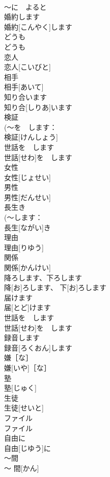 \documentclass[8pt]{extreport}
\begin{document}
\begin{CJK}{UTF8}{min}
\\	〜に　よると	
\\	婚約します	
\\	婚約[こんやく]します	
\\	どうも	
\\	どうも	
\\	恋人	
\\	恋人[こいびと]	
\\	相手	
\\	相手[あいて]	
\\	知り合います	
\\	知り合[しりあ]います	
\\	検証	
\\	(〜を　します：
\\	検証[けんしょう]	
\\	世話を　します	
\\	世話[せわ]を　します	
\\	女性	
\\	女性[じょせい]	
\\	男性	
\\	男性[だんせい]	
\\	長生き	
\\	(〜します：
\\	長生[ながい]き	
\\	理由	
\\	理由[りゆう]	
\\	関係	
\\	関係[かんけい]	
\\	降ろします、下ろします	
\\	降[お]ろします、 下[お]ろします	
\\	届けます	
\\	届[とど]けます	
\\	世話を　します	
\\	世話[せわ]を　します	
\\	録音します	
\\	録音[ろくおん]します	
\\	嫌［な］	
\\	嫌[いや]［な］	
\\	塾	
\\	塾[じゅく]	
\\	生徒	
\\	生徒[せいと]	
\\	ファイル	
\\	ファイル	
\\	自由に	
\\	自由[じゆう]に	
\\	〜間	
\\	〜 間[かん]	

\end{CJK}
\end{document}
